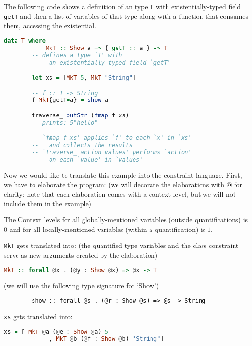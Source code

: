 \begin{ex}[Existentials]
    The following code shows a definition of an type \lstinline{T} with existentially-typed field \lstinline{getT} and then a list of variables of that type along with a function that consumes them, accessing the existential. 

    \begin{lstlisting}[language=Haskell]
        data T where
            MkT :: Show a => { getT :: a } -> T
        -- defines a type `T' with
        --   an existentially-typed field `getT'

        let xs = [MkT 5, MkT "String"]

        -- f :: T -> String
        f MkT{getT=a} = show a

        traverse_ putStr (fmap f xs)
        -- prints: 5"hello"

        -- `fmap f xs' applies `f' to each `x' in `xs'
        --   and collects the results
        -- `traverse_ action values' performs `action'
        --   on each `value' in `values'
    \end{lstlisting}

    Now we would like to translate this example into the constraint language. First, we have to elaborate the program: (we will decorate the elaborations with $@$ for clarity; note that each elaboration comes with a context level, but we will not include them in the example)

    The Context levels for all globally-mentioned variables (outside quantifications) is $0$ and for all locally-mentioned variables (within a quantification) is $1$.

    \lstinline{MkT} gets translated into: (the quantified type variables and the class constraint serve as new arguments created by the elaboration)
    \begin{lstlisting}[language=Haskell]
        MkT :: forall @x . (@y : Show @x) => @x -> T
    \end{lstlisting}

    (we will use the following type signature for `Show')
    \begin{lstlisting}
        show :: forall @s . (@r : Show @s) => @s -> String
    \end{lstlisting}

    \lstinline{xs} gets translated into: 

    \begin{lstlisting}[language=Haskell]
        xs = [ MkT @a (@e : Show @a) 5
             , MkT @b (@f : Show @b) "String"]
    \end{lstlisting}


\end{ex}
